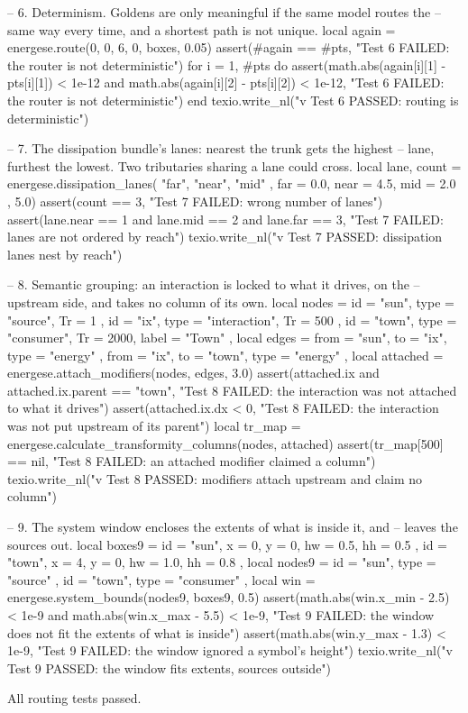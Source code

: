 \documentclass{article}
\begin{document}
\begin{luacode*}
    -- 6. Determinism. Goldens are only meaningful if the same model routes the
    --    same way every time, and a shortest path is not unique.
    local again = energese.route(0, 0, 6, 0, boxes, 0.05)
    assert(#again == #pts, "Test 6 FAILED: the router is not deterministic")
    for i = 1, #pts do
        assert(math.abs(again[i][1] - pts[i][1]) < 1e-12
           and math.abs(again[i][2] - pts[i][2]) < 1e-12,
           "Test 6 FAILED: the router is not deterministic")
    end
    texio.write_nl("v Test 6 PASSED: routing is deterministic")

    -- 7. The dissipation bundle's lanes: nearest the trunk gets the highest
    --    lane, furthest the lowest. Two tributaries sharing a lane could cross.
    local lane, count = energese.dissipation_lanes(
        { "far", "near", "mid" },
        { far = 0.0, near = 4.5, mid = 2.0 }, 5.0)
    assert(count == 3, "Test 7 FAILED: wrong number of lanes")
    assert(lane.near == 1 and lane.mid == 2 and lane.far == 3,
           "Test 7 FAILED: lanes are not ordered by reach")
    texio.write_nl("v Test 7 PASSED: dissipation lanes nest by reach")

    -- 8. Semantic grouping: an interaction is locked to what it drives, on the
    --    upstream side, and takes no column of its own.
    local nodes = {
        { id = "sun", type = "source", Tr = 1 },
        { id = "ix", type = "interaction", Tr = 500 },
        { id = "town", type = "consumer", Tr = 2000, label = "Town" },
    }
    local edges = {
        { from = "sun", to = "ix", type = "energy" },
        { from = "ix", to = "town", type = "energy" },
    }
    local attached = energese.attach_modifiers(nodes, edges, 3.0)
    assert(attached.ix and attached.ix.parent == "town",
           "Test 8 FAILED: the interaction was not attached to what it drives")
    assert(attached.ix.dx < 0, "Test 8 FAILED: the interaction was not put upstream of its parent")
    local tr_map = energese.calculate_transformity_columns(nodes, attached)
    assert(tr_map[500] == nil, "Test 8 FAILED: an attached modifier claimed a column")
    texio.write_nl("v Test 8 PASSED: modifiers attach upstream and claim no column")

    -- 9. The system window encloses the extents of what is inside it, and
    --    leaves the sources out.
    local boxes9 = {
        { id = "sun", x = 0, y = 0, hw = 0.5, hh = 0.5 },
        { id = "town", x = 4, y = 0, hw = 1.0, hh = 0.8 },
    }
    local nodes9 = {
        { id = "sun", type = "source" },
        { id = "town", type = "consumer" },
    }
    local win = energese.system_bounds(nodes9, boxes9, 0.5)
    assert(math.abs(win.x_min - 2.5) < 1e-9 and math.abs(win.x_max - 5.5) < 1e-9,
           "Test 9 FAILED: the window does not fit the extents of what is inside")
    assert(math.abs(win.y_max - 1.3) < 1e-9,
           "Test 9 FAILED: the window ignored a symbol's height")
    texio.write_nl("v Test 9 PASSED: the window fits extents, sources outside")
\end{luacode*}

All routing tests passed.
\end{document}
